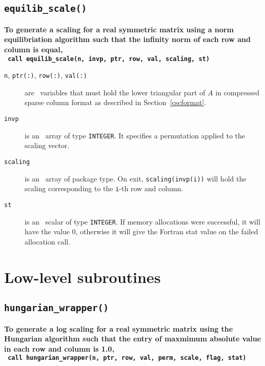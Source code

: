 
\subsection{\texttt{equilib\_scale()}}

\textbf{\noindent
   To generate a scaling for a real symmetric matrix using a norm equilibriation algorithm such that the infinity norm of each row and column is equal,
   \vspace*{0.1cm} \\
   \texttt{ \hspace*{0.2cm}
      call equilib\_scale(n, invp, ptr, row, val, scaling, st)
   }
   \vspace{0.3cm}
}

\begin{description}

\item[\texttt{n}, \texttt{ptr(:)}, \texttt{row(:)}, \texttt{val(:)}] are \intentin\ variables that must hold the lower triangular part of $A$ in compressed sparse column format as described in Section~\ref{cscformat}.

\item[\texttt{invp}] is an \intentin\ array of type {\tt INTEGER}. It specifies
a permutation applied to the scaling vector.

\item[\texttt{scaling}] is an \intentout\ array of package type. On exit,
\texttt{scaling(invp(i))} will hold the scaling corresponding to the
\texttt{i}-th row and column.

\item[\texttt{st}] is an \intentout\ scalar of type {\tt INTEGER}. If memory allocations were successful, it will have the value 0, otherwise it will give the
Fortran stat value on the failed allocation call.

\end{description}

\section{Low-level subroutines}

\subsection{\texttt{hungarian\_wrapper()}}


\textbf{\noindent
   To generate a log scaling for a real symmetric matrix using the Hungarian algorithm such that the entry of maxmimum absolute value in each row and column is 1.0,
   \vspace*{0.1cm} \\
   \texttt{ \hspace*{0.2cm}
      call hungarian\_wrapper(n, ptr, row, val, perm, scale, flag, stat)
   }
   \vspace{0.3cm}
}

